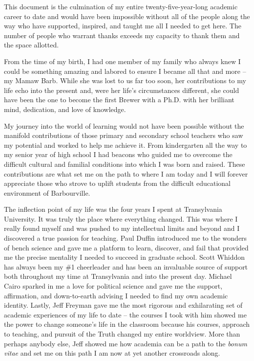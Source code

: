 \documentclass[PhD]{dukethesis2006}
\begin{document}
\begin{doublespace}

This document is the culmination of my entire twenty-five-year-long academic career to date and would have been impossible without all of the people along the way who have supported, inspired, and taught me all I needed to get here. The number of people who warrant thanks exceeds my capacity to thank them and the space allotted. 

From the time of my birth, I had one member of my family who always knew I could be something amazing and labored to ensure I became all that and more -- my Mamaw Barb. While she was lost to us far too soon, her contributions to my life echo into the present and, were her life's circumstances different, she could have been the one to become the first Brewer with a Ph.D. with her brilliant mind, dedication, and love of knowledge.

My journey into the world of learning would not have been possible without the manifold contributions of those primary and secondary school teachers who saw my potential and worked to help me achieve it. From kindergarten all the way to my senior year of high school I had beacons who guided me to overcome the difficult cultural and familial conditions into which I was born and raised. These contributions are what set me on the path to where I am today and I will forever appreciate those who strove to uplift students from the difficult educational environment of Barbourville.

The inflection point of my life was the four years I spent at Transylvania University. It was truly the place where everything changed. This was where I really found myself and was pushed to my intellectual limits and beyond and I  discovered a true passion for teaching. Paul Duffin introduced me to the wonders of bench science and gave me a platform to learn, discover, and fail that provided me the precise mentality I needed to succeed in graduate school. Scott Whiddon has always been my \#1 cheerleader and has been an invaluable source of support both throughout my time at Transylvania and into the present day. Michael Cairo sparked in me a love for political science and gave me the support, affirmation, and down-to-earth advising I needed to find my own academic identity. Lastly, Jeff Freyman gave me the most rigorous and exhilarating set of academic experiences of my life to date -- the courses I took with him showed me the power to change someone's life in the classroom because his courses, approach to teaching, and pursuit of the Truth changed my entire worldview. More than perhaps anybody else, Jeff showed me how academia can be a path to the \textit{bonum vitae} and set me on this path I am now at yet another crossroads along.


\end{doublespace}
\end{document}
